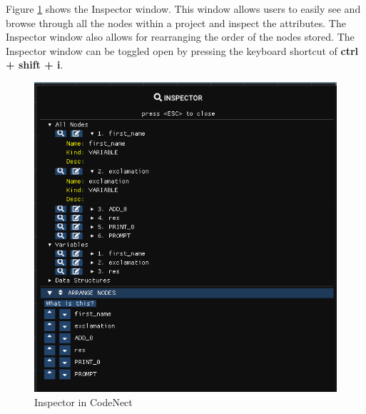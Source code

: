 \parx
Figure \ref{fig:cn_inspector} shows the Inspector window. This window allows
users to easily see and browse through all the nodes within a project and
inspect the attributes. The Inspector window also allows for rearranging the
order of the nodes stored. The Inspector window can be toggled open by pressing the
keyboard shortcut of \textbf{ctrl + shift + i}.

\begin{figure}[H]
	\centering
	\captionsetup{justification=centering}
	\captionsetup[figure]{list=yes}
	\includegraphics[width=\linewidth]{media/sc_inspector.png}
	\caption[Inspector in CodeNect]{Inspector in CodeNect}
	\label{fig:cn_inspector}
\end{figure}
